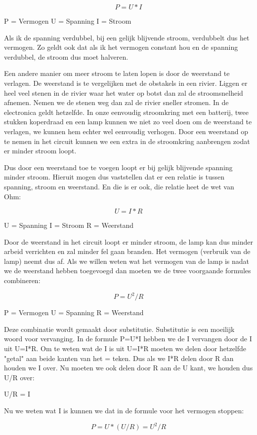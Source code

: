\[ P = U*I \]

P = Vermogen
U = Spanning
I = Stroom

Als ik de spanning verdubbel, bij een gelijk blijvende stroom, verdubbelt dus het vermogen. Zo geldt ook dat als ik het vermogen constant hou en de spanning verdubbel, de stroom dus moet halveren.

Een andere manier om meer stroom te laten lopen is door de weerstand te verlagen. De weerstand is te vergelijken met de obstakels in een rivier. Liggen er heel veel stenen in de rivier waar het water op botst dan zal de stroomsnelheid afnemen. Nemen we de stenen weg dan zal de rivier sneller stromen. In de electronica geldt hetzelfde. In onze eenvoudig stroomkring met een batterij, twee stukken koperdraad en een lamp kunnen we niet zo veel doen om de weerstand te verlagen, we kunnen hem echter wel eenvoudig verhogen. Door een weerstand op te nemen in het circuit kunnen we een extra  in de stroomkring aanbrengen zodat er minder stroom loopt.

Dus door een weerstand toe te voegen loopt er bij gelijk blijvende spanning minder stroom. Hieruit mogen dus vaststellen dat er een relatie is tussen spanning, stroom en weerstand. En die is er ook, die relatie heet de wet van Ohm:

\[ U = I*R \]

U = Spanning
I = Stroom
R = Weerstand

Door de weerstand in het circuit loopt er minder stroom, de lamp kan dus minder arbeid verrichten en zal minder fel gaan branden. Het vermogen (verbruik van de lamp) neemt dus af. Als we willen weten wat het vermogen van de lamp is nadat we de weerstand hebben toegevoegd dan moeten we de twee voorgaande formules combineren:

\[ P = U^2/R \]

P = Vermogen
U = Spanning
R = Weerstand

Deze combinatie wordt gemaakt door substitutie. Substitutie is een moeilijk woord voor vervanging. In de formule P=U*I hebben we de I vervangen door de I uit U=I*R. Om te weten wat de I is uit U=I*R moeten we delen door hetzelfde "getal" aan beide kanten van het = teken. Dus als we I*R delen door R dan houden we I over. Nu moeten we ook delen door R aan de U kant, we houden dus U/R over:

U/R = I

Nu we weten wat I is kunnen we dat in de formule voor het vermogen stoppen:

\[ P = U*(U/R) = U^2/R \]

